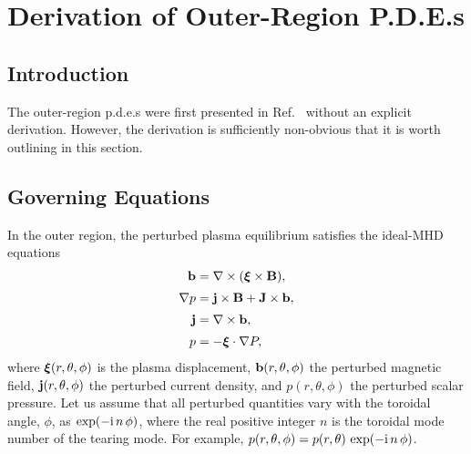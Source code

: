 \documentclass[12pt,prb,aps]{revtex4-1}
\newcommand {\bxi}{\mbox{\boldmath$\xi$}}
\begin{document}
\section{Derivation of Outer-Region P.D.E.s}\label{opde}
\subsection{Introduction}
The outer-region p.d.e.s  were first presented in Ref.~ without an explicit
derivation. However, the derivation is sufficiently non-obvious that it is worth outlining in this section. 

\subsection{Governing Equations}\label{mhd}
In the outer region, the perturbed plasma equilibrium satisfies the  ideal-MHD equations\,\cite{connor,am1,am3,gs1}
\begin{align}
{\bf b} &= \nabla\times (\bxi\times {\bf B}),\label{e21}\\[0.5ex]
\nabla p &={\bf j}\times {\bf B}  +{\bf J}\times {\bf b},\label{e22}\\[0.5ex]
{\bf j} &= \nabla\times {\bf b},\label{e23}\\[0.5ex]
p&= -\bxi\cdot\nabla P,\label{e24}
\end{align}
where $\bxi(r,\theta,\phi)$ is the plasma displacement, ${\bf b}(r,\theta,\phi)$ the perturbed magnetic field,
${\bf j}(r,\theta,\phi)$ the perturbed current density, and $p(r,\theta,\phi)$ the perturbed scalar pressure. 
Let us assume that all perturbed quantities vary with the toroidal angle, $\phi$, as $\exp(-{\rm i}\,n\,\phi)$, where the real positive integer $n$ is the
toroidal mode number of the tearing mode. For example, $p(r,\theta,\phi) = p(r,\theta)\,\exp(-{\rm i}\,n\,\phi)$. 
\end{document}
